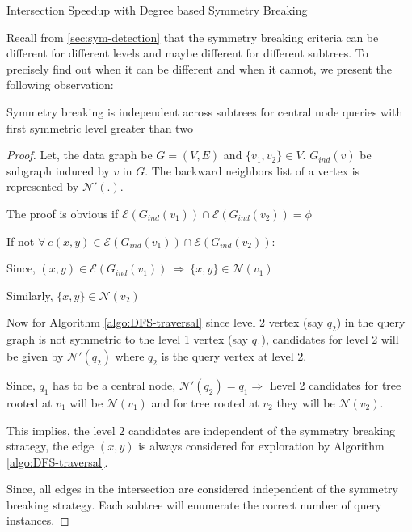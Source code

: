 {\begin{table}[h]
    \caption{Intersection Speedup with Degree based Symmetry Breaking}
    \label{tab:degree-sb}
\end{table}


Recall from \ref{sec:sym-detection} that the symmetry breaking criteria can be different for different levels and maybe different for different subtrees.
To precisely find out when it can be different and when it cannot, we present the following observation:
\begin{theorem} \label{thm:hybrid-sb}
    Symmetry breaking is independent across subtrees for central node queries with first symmetric level greater than two
\end{theorem}
\begin{proof}
    Let, the data graph be $G=(V, E)$ and $\{v_1, v_2\} \in V$. $G_{ind}(v)$ be subgraph induced by $v$ in $G$.
    The backward neighbors list of a vertex is represented by $\mathcal{N}'(.)$.

    The proof is obvious if $\mathcal{E}(G_{ind}(v_1)) \cap \mathcal{E}(G_{ind}(v_2)) = \phi $

    If not $ \forall ~ e(x,y) \in \mathcal{E}(G_{ind}(v_1)) \cap \mathcal{E}(G_{ind}(v_2))$:

    Since, $(x,y) \in \mathcal{E}(G_{ind}(v_1)) ~ \Rightarrow ~ \{x,y\} \in \mathcal{N}(v_1)$

    Similarly,  $\{x,y\} \in \mathcal{N}(v_2)$

    Now for Algorithm \ref{algo:DFS-traversal} since level 2 vertex (say $q_2$) in the query graph is not symmetric to the level 1 vertex (say $q_1$), candidates for level 2 will be given by $\mathcal{N'}(q_2)$ where $q_2$ is the query vertex at level 2.

    Since, $q_1$ has to be a central node, $\mathcal{N'}(q_2)=q_1 \Rightarrow $ Level 2 candidates for tree rooted at $v_1$ will be $\mathcal{N}(v_1)$ and for tree rooted at $v_2$ they will be $\mathcal{N}(v_2).$

    This implies, the level $2$ candidates are independent of the symmetry breaking strategy, the edge $(x,y)$ is always considered for exploration by Algorithm \ref{algo:DFS-traversal}.

    Since, all edges in the intersection are considered independent of the symmetry breaking strategy. Each subtree will enumerate the correct number of query instances.
\end{proof}

}
